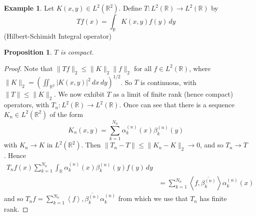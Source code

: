\documentclass[justified]{tufte-book}
\theoremstyle{plain}%
\newtheorem{prop}[thm]{Proposition}
\theoremstyle{definition}
\newtheorem{exmp}[thm]{Example}
\theoremstyle{remark}
\newcommand{\R}{\mathbb{R}}
\newcommand{\iprod}[1]{\left\langle #1 \right\rangle}
\begin{document}
\begin{exmp}
  Let $K(x, y) \in L^2(\R^2)$.  Define $T : L^2(\R) \rightarrow  L^2(\R)$ by \[
      Tf(x) = \int_\R K(x, y) f(y) \, dy
  \] (Hilbert-Schimidt Integral operator)
\end{exmp}
\begin{prop}
  $T$ is compact.  
\end{prop}
\begin{proof}
  Note that $\| Tf \|_2 \leq \| K \|_2 \| f \|_2$ for all $f \in L^2(\R)$, where $\| K \|_2 = \left( \iint_{\R^2} |K(x, y)|^2 \, dx \, dy \right)^{1/2}$.  So $T$ is continuous, with $\| T \| \leq \| K \|_2$.  We now exhibit $T$ as a limit of finite rank (hence compact) operators, with $T_n : L^2(\R) \rightarrow L^2(\R)$.  Once can see that there is a sequence $K_n \in L^2(\R^2)$ of the form \[
      K_n(x, y) = \sum_{k=1}^{N_n} \alpha_k^{(n)}(x) \beta_{k}^{(n)}(y)
  \] with $K_n \rightarrow K$ in $L^2(\R^2)$.  Then $\| T_n - T \| \leq \| K_n - K \|_2 \rightarrow 0$, and so $T_n \rightarrow T$.  Hence 
  \begin{align*}
      T_n f(x) \sum_{k=1}^{N_n} \int_\R \alpha_k^{(n)}(x) \beta_k^{(n)}(y) f(y) \, dy \\
      &= \sum_{k=1}^{N_n} \iprod{f, \overline{\beta_k^{(n)}}} \alpha_k^{(n)} (x) 
  \end{align*}  and so $T_nf = \sum_{k=1}^{N_n} \iprod f, \overline{\beta_k^{(n)}} \alpha_k^{(n)}$ from which we use that $T_n$ has finite rank.  
\end{proof}




\end{document}
